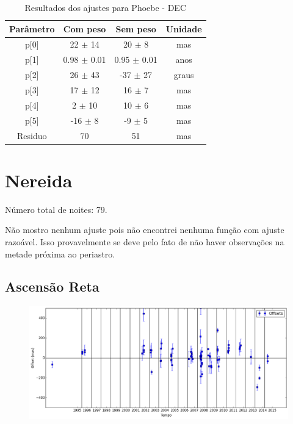 \documentclass[11pt,a4paper]{report}
\begin{document}
\begin{table}[h!]
\caption{\label{Tab: Phoebe-DEC} Resultados dos ajustes para Phoebe - DEC}
\begin{centering}
\begin{tabular}{cccc}
\hline
\hline
Parâmetro & Com peso & Sem peso & Unidade\tabularnewline
\hline
p[0] & 22 $\pm$ 14 & 20 $\pm$ 8 & mas\\
p[1] & 0.98 $\pm$ 0.01 & 0.95 $\pm$ 0.01 & anos\\
p[2] & 26 $\pm$ 43 & -37 $\pm$ 27 & graus\\
p[3] & 17 $\pm$ 12 & 16 $\pm$ 7 & mas\\
p[4] & 2 $\pm$ 10 & 10 $\pm$ 6 & mas\\
p[5] & -16 $\pm$ 8 & -9 $\pm$ 5 & mas\\
Residuo & 70 & 51 & mas\\
\hline 
\end{tabular} 
\par\end{centering}
\end{table}

\chapter*{Nereida}

\indent \indent Número total de noites: 79.

Não mostro nenhum ajuste pois não encontrei nenhuma função com ajuste razoável. Isso provavelmente se deve pelo fato de não haver observações na metade próxima ao periastro.

\section*{Ascensão Reta}

\begin{figure}[h]
\includegraphics[scale=0.45]{Nereida/RA.png} 
\end{figure}
\end{document}
